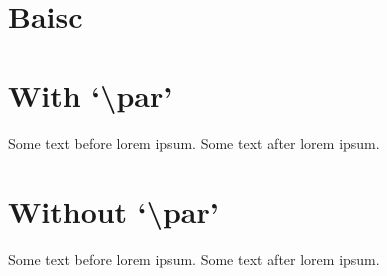 \documentclass[UTF8]{ctexart}
\begin{document}
\section{Baisc}
\zhlipsum

\section{With `\textbackslash par'}
Some text before lorem ipsum.
\zhlipsum[10]
Some text after lorem ipsum.

\section{Without `\textbackslash par'}
Some text before lorem ipsum.
\zhlipsum*[10]
Some text after lorem ipsum.
\end{document}
